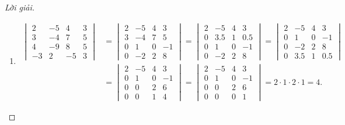 \documentclass[class=nhvh-linear-algebra,crop=false]{standalone}
\begin{document}
\begin{proof}[Lời giải]
	\begin{enumerate}[label = (\alph*)]
		\item
		      \begin{align*}
			      \begin{vmatrix}
				      2  & -5 & 4  & 3 \\
				      3  & -4 & 7  & 5 \\
				      4  & -9 & 8  & 5 \\
				      -3 & 2  & -5 & 3
			      \end{vmatrix}
			       & =
			      \begin{vmatrix}
				      2 & -5 & 4 & 3  \\
				      3 & -4 & 7 & 5  \\
				      0 & 1  & 0 & -1 \\
				      0 & -2 & 2 & 8
			      \end{vmatrix}
			      =
			      \begin{vmatrix}
				      2 & -5  & 4 & 3   \\
				      0 & 3.5 & 1 & 0.5 \\
				      0 & 1   & 0 & -1  \\
				      0 & -2  & 2 & 8
			      \end{vmatrix}
			      =
			      \begin{vmatrix}
				      2 & -5  & 4 & 3   \\
				      0 & 1   & 0 & -1  \\
				      0 & -2  & 2 & 8   \\
				      0 & 3.5 & 1 & 0.5
			      \end{vmatrix} \\
			       & =
			      \begin{vmatrix}
				      2 & -5 & 4 & 3  \\
				      0 & 1  & 0 & -1 \\
				      0 & 0  & 2 & 6  \\
				      0 & 0  & 1 & 4
			      \end{vmatrix}
			      =
			      \begin{vmatrix}
				      2 & -5 & 4 & 3  \\
				      0 & 1  & 0 & -1 \\
				      0 & 0  & 2 & 6  \\
				      0 & 0  & 0 & 1
			      \end{vmatrix}
			      = 2\cdot 1\cdot 2\cdot 1 = 4.
		      \end{align*}

\end{enumerate}
\end{proof}
\end{document}
